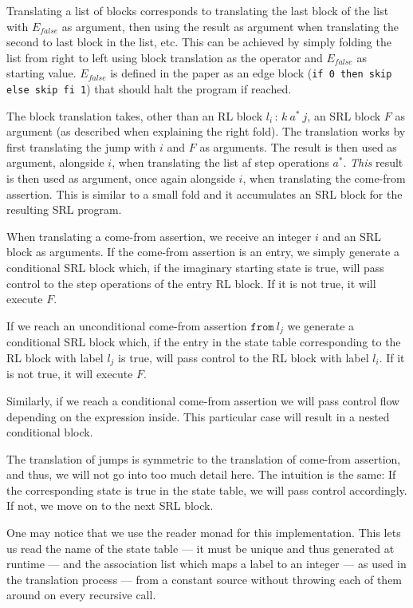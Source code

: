 Translating a list of blocks corresponds to translating the last block of the list with $E_{false}$ as argument, then using the result as argument when translating the second to last block in the list, etc. This can be achieved by simply folding the list from right to left using block translation as the operator and $E_{false}$ as starting value. $E_{false}$ is defined in the paper as an edge block (\texttt{if 0 then skip else skip fi 1}) that should halt the program if reached.

The block translation takes, other than an RL block $l_i \, : \, k \ a^* \ j$, an SRL block $F$ as argument (as described when explaining the right fold). The translation works by first translating the jump with $i$ and $F$ as arguments. The result is then used as argument, alongside $i$, when translating the list af step operations $a^*$. \textit{This} result is then used as argument, once again alongside $i$, when translating the come-from assertion. This is similar to a small fold and it accumulates an SRL block for the resulting SRL program.

When translating a come-from assertion, we receive an integer $i$ and an SRL block as arguments. If the come-from assertion is an entry, we simply generate a conditional SRL block which, if the imaginary starting state is true, will pass control to the step operations of the entry RL block. If it is not true, it will execute $F$.

If we reach an unconditional come-from assertion $\texttt{from} \ l_j$ we generate a conditional SRL block which, if the entry in the state table corresponding to the RL block with label $l_j$ is true, will pass control to the RL block with label $l_i$. If it is not true, it will execute $F$.

Similarly, if we reach a conditional come-from assertion we will pass control flow depending on the expression inside. This particular case will result in a nested conditional block.

The translation of jumps is symmetric to the translation of come-from assertion, and thus, we will not go into too much detail here. The intuition is the same: If the corresponding state is true in the state table, we will pass control accordingly. If not, we move on to the next SRL block.

One may notice that we use the reader monad for this implementation. This lets us read the name of the state table --- it must be unique and thus generated at runtime --- and the association list which maps a label to an integer --- as used in the translation process --- from a constant source without throwing each of them around on every recursive call.

